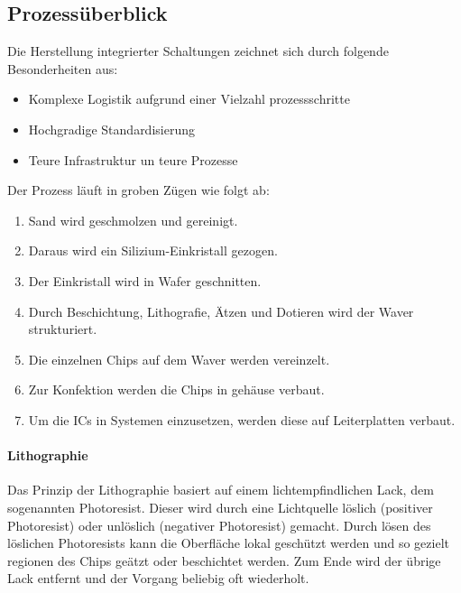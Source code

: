 \subsection{Prozessüberblick}
Die Herstellung integrierter Schaltungen zeichnet sich durch folgende Besonderheiten aus:
\begin{itemize}
    \item Komplexe Logistik aufgrund einer Vielzahl prozessschritte
    \item Hochgradige Standardisierung
    \item Teure Infrastruktur un teure Prozesse
\end{itemize}

Der Prozess läuft in groben Zügen wie folgt ab:
\begin{enumerate}
    \item Sand wird geschmolzen und gereinigt.
    \item Daraus wird ein Silizium-Einkristall gezogen.
    \item Der Einkristall wird in Wafer geschnitten.
    \item Durch Beschichtung, Lithografie, Ätzen und Dotieren wird der Waver strukturiert.
    \item Die einzelnen Chips auf dem Waver werden vereinzelt.
    \item Zur Konfektion werden die Chips in gehäuse verbaut.
    \item Um die ICs in Systemen einzusetzen, werden diese auf Leiterplatten verbaut.
\end{enumerate}

\paragraph{Lithographie}
Das Prinzip der Lithographie basiert auf einem lichtempfindlichen Lack, dem sogenannten Photoresist.
Dieser wird durch eine Lichtquelle löslich (positiver Photoresist) oder unlöslich (negativer Photoresist) gemacht. %
Durch lösen des löslichen Photoresists kann die Oberfläche lokal geschützt werden und so gezielt regionen des Chips geätzt oder beschichtet werden.
Zum Ende wird der übrige Lack entfernt und der Vorgang beliebig oft wiederholt.

